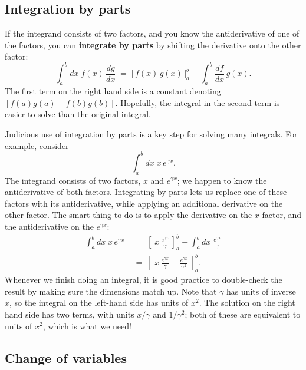 \documentclass[10pt,a4paper]{article}
\begin{document}
\subsection{Integration by parts}

If the integrand consists of two factors, and you know the
antiderivative of one of the factors, you can \textbf{integrate by
  parts} by shifting the derivative onto the other factor:
\begin{equation}
\int_a^b dx \; f(x) \, \frac{dg}{dx} \;=\; \Big[\,f(x)\, g(x)\,\Big]_a^b - \int_a^b \frac{df}{dx}\, g(x). 
\end{equation}
The first term on the right hand side is a constant denoting
$[f(a)g(a) - f(b)g(b)]$. Hopefully, the integral in the second term is
easier to solve than the original integral.

Judicious use of integration by parts is a key step for solving many
integrals. For example, consider
\begin{equation}
\int_a^b dx\; x \, e^{\gamma x}.
\end{equation}
The integrand consists of two factors, $x$ and $e^{\gamma x}$; we
happen to know the antiderivative of both factors. Integrating by parts
lets us replace one of these factors with its antiderivative, while
applying an additional derivative on the other factor. The smart thing
to do is to apply the derivative on the $x$ factor, and the
antiderivative on the $e^{\gamma x}$:
\begin{align}
  \int_a^b dx\; x\, e^{\gamma x} \;&=\; \left[\;x\, \frac{e^{\gamma x}}{\gamma}\, \right]_a^b - \int_a^b dx\; \frac{e^{\gamma x}}{\gamma} \\
  &=\; \left[\;x\, \frac{e^{\gamma x}}{\gamma} - \frac{e^{\gamma x}}{\gamma^2} \,\right]_a^b.
\end{align}
Whenever we finish doing an integral, it is good practice to
double-check the result by making sure the dimensions match up. Note
that $\gamma$ has units of inverse $x$, so the integral on the
left-hand side has units of $x^2$. The solution on the right hand side
has two terms, with units $x/\gamma$ and $1/\gamma^2$; both of these
are equivalent to units of $x^2$, which is what we need!

\subsection{Change of variables}
\label{change-of-variables}
\end{document}
